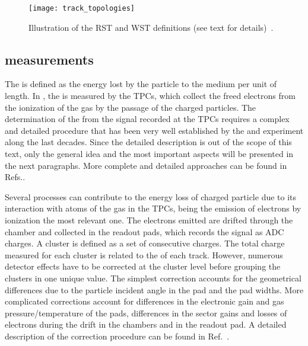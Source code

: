 \begin{figure}[!ht]
  \centering
  \texttt{[image: track\_topologies]}
  \caption{Illustration of the RST and WST definitions (see text for details)~\cite{MartinThesis}.}
  \label{fig:hadron:track:topologies}
\end{figure}


\subsection{\boldmath \boldmath \dedx measurements}
\label{sec:hadron:dedx:meas}

The \dedx is defined as the energy lost by the
particle to the medium per unit of length. 
In \NASixtyOne, the \dedx is measured by the TPCs, which collect the 
freed electrons from the ionization of the gas by the passage of the charged particles.
The determination of the \dedx from the signal recorded at the TPCs requires a complex and
detailed procedure that has been very well established by the \NAFortyNine and \NASixtyOne
experiment along the last decades. Since the detailed description 
is out of the scope of this text, only the general idea and the most important aspects
will be presented in the next paragraphs. More complete and detailed approaches
can be found in Refs.\cite{BlumBook,LeeuwenThesis,GaborVeresThesis}.

Several processes can contribute to the energy loss of charged particle due to
its interaction with atoms of the gas in the TPCs, being the emission of
electrons by ionization the most relevant one. The electrons emitted are
drifted through the chamber and collected in the readout pads, which records
the signal as ADC charges. A cluster is defined as a set of consecutive charges.
The total charge measured for each cluster is related to the \dedx of each track.
However, numerous detector effects have to be corrected at the cluster level before
grouping the clusters in one unique \dedx value. The simplest correction accounts for
the geometrical differences due to the particle incident angle in the pad and
the pad widths. More complicated corrections account for differences in the electronic
gain and gas pressure/temperature of the pads, differences in the sector gains and
losses of electrons during the drift in the chambers and in the readout pad.
A detailed description of the correction procedure can be found in Ref.~\cite{AntoniMThesis}.

